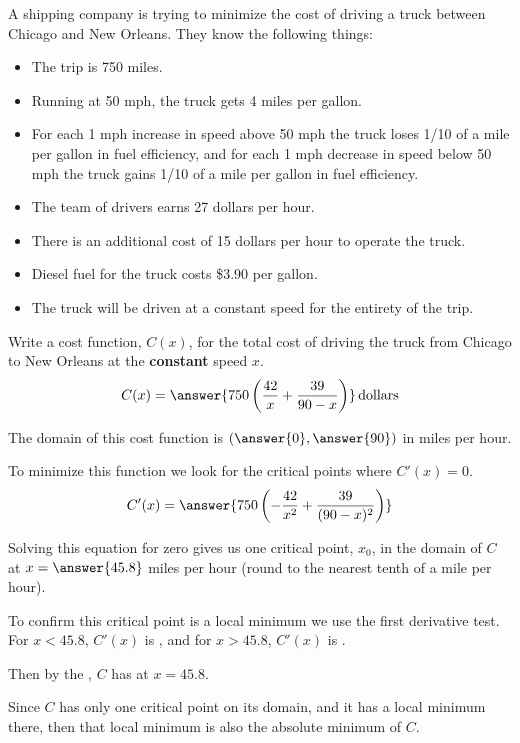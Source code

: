 \documentclass{ximera}
\author{Nela Lakos \and Kyle Parsons}
\begin{document}
\begin{exercise}

	A shipping company is trying to minimize the cost of driving a truck between Chicago and New Orleans.  They know the following things:
	\begin{itemize}
		\item The trip is 750 miles.
		\item Running at 50 mph, the truck gets 4 miles per gallon.
		\item For each 1 mph increase in speed above 50 mph the truck loses 1/10 of a mile per gallon in fuel efficiency, and for each 1 mph decrease 
			in speed below 50 mph the truck gains 1/10 of a mile per gallon in fuel efficiency.
		\item The team of drivers earns 27 dollars per hour.
		\item There is an additional cost of 15 dollars per hour to operate the truck.
		\item Diesel fuel for the truck costs \$3.90 per gallon.
		\item The truck will be driven at a constant speed for the entirety of the trip.
	\end{itemize}

	Write a cost function, $C(x)$, for the total cost of driving the truck from Chicago to New Orleans at the \textbf{constant} speed $x$.
	\[ C(x) = \answer{750\left(\frac{42}{x}+\frac{39}{90-x}\right)}\,\text{dollars} \]

	\begin{exercise}
		The domain of this cost function is $\left(\answer{0},\answer{90}\right)$ in miles per hour.
		\begin{exercise}
			To minimize this function we look for the critical points where $C'(x)=0$.  
			\[ C'(x) = \answer{750\left(-\frac{42}{x^2} + \frac{39}{(90-x)^2}\right)} \]

			\begin{exercise}
				Solving this equation for zero gives us one critical point, $x_0$, in the domain of $C$ at $x=\answer{45.8}$ miles per hour 
				(round to the nearest tenth of a mile per hour).

				\begin{exercise}
					To confirm this critical point is a local minimum we use the first derivative test.  For $x<45.8$, $C'(x)$ is 
					, and for $x>45.8$, $C'(x)$ is .
					\begin{exercise}
						  Then by the , $C$ has  
						   at $x=45.8$.
						  \begin{exercise}
						  	Since $C$ has only one critical point on its domain, and it has a local minimum there, then that local minimum is also the 
							absolute minimum of $C$.


\end{exercise}
\end{exercise}
\end{exercise}
\end{exercise}
\end{exercise}
\end{exercise}
\end{exercise}
\end{document}
